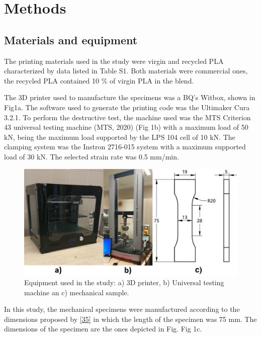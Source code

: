 \documentclass[conference,final,]{IEEEtran}
\begin{document}
\hypertarget{methods}{%
\section{Methods}\label{methods}}

\hypertarget{materials-and-equipment}{%
\subsection{Materials and equipment}\label{materials-and-equipment}}

The printing materials used in the study were virgin and recycled PLA
characterized by data listed in Table S1. Both materials were commercial
ones, the recycled PLA contained 10 \% of virgin PLA in the blend.

The 3D printer used to manufacture the specimens was a BQ's Witbox,
shown in Fig1a. The software used to generate the printing code was the
Ultimaker Cura 3.2.1. To perform the destructive test, the machine used
was the MTS Criterion 43 universal testing machine (MTS, 2020) (Fig 1b)
with a maximum load of 50 kN, being the maximum load supported by the
LPS 104 cell of 10 kN. The clamping system was the Instron 2716-015
system with a maximum supported load of 30 kN. The selected strain rate
was 0.5 mm/min.

\begin{figure}

{\centering \includegraphics[width=0.9\linewidth]{Figures/Machine-probeta} 

}

\caption{Equipment used in the study: a) 3D printer, b) Universal testing machine an c) mechanical sample.}\label{fig:Fig.machine}
\end{figure}

In this study, the mechanical specimens were manufactured according to
the dimensions proposed by \protect\hyperlink{ref-Lin2018}{{[}35{]}} in
which the length of the specimen was 75 mm. The dimensions of the
specimen are the ones depicted in Fig. Fig 1c.
\end{document}
